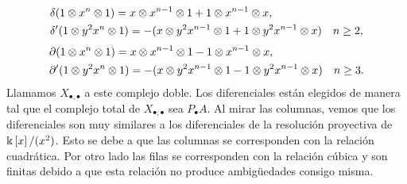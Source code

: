 \documentclass[fleqn,../tesis.tex]{subfiles}
\begin{document}
\begin{align*}	
	&\delta(1 \otimes x^n \otimes 1) = x \otimes x^{n -1} \otimes 1 + 1 \otimes x^{n - 1} \otimes x,\\
	&\delta'(1 \otimes y^2x^n \otimes 1) = - (x \otimes y^2 x^{n -1} \otimes 1 + 1 \otimes y^2x^{n - 1} \otimes x) \quad n \geq 2,
\end{align*}
\begin{align*}
	&\partial(1 \otimes x^n \otimes 1) = x \otimes x^{n -1} \otimes 1 - 1 \otimes x^{n - 1} \otimes x,\\
	&\partial'(1 \otimes y^2x^n \otimes 1) = -(x \otimes y^2 x^{n -1} \otimes 1 - 1 \otimes y^2x^{n - 1} \otimes x) \quad n \geq 3.
\end{align*}
Llamamos $X_{\bullet, \bullet}$ a este complejo doble. Los diferenciales están elegidos
de manera tal que el complejo total de $X_{\bullet, \bullet}$ sea $P_{\bullet}A$. Al
mirar las columnas, vemos que los diferenciales son muy similares a los diferenciales
de la resolución proyectiva de $\Bbbk\left[x\right]/(x^2)$. Esto se debe
a que las columnas se corresponden con la relación cuadrática. Por otro lado
las filas se corresponden con la relación cúbica y son finitas debido a que
esta relación no produce ambigüedades consigo misma.
\end{document}
